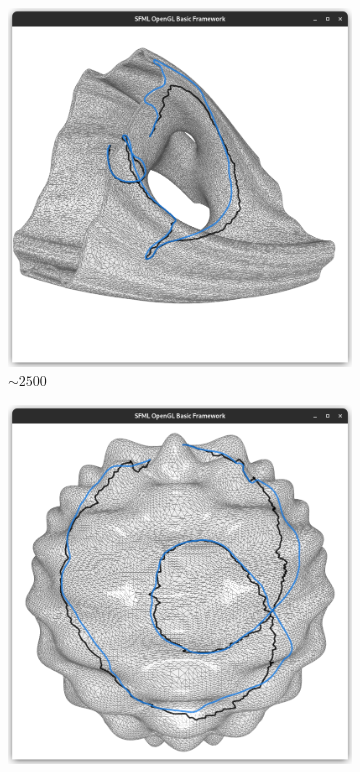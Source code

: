 \documentclass{stdlocal}
\begin{document}
\begin{figure}
  \begin{subfigure}[b]{0.24\linewidth}
    \centering
    \includegraphics[width=\linewidth,trim={25px 20 25 50},clip]{images/julia-smooth-0.95.png}
    \caption{$\sim 2500$}
  \end{subfigure}
  \begin{subfigure}[b]{0.24\linewidth}
    \centering
    \includegraphics[width=\linewidth,trim={25px 20 25 50},clip]{images/harmonic-smooth-0.95.png}

\end{subfigure}
\end{figure}
\end{document}
